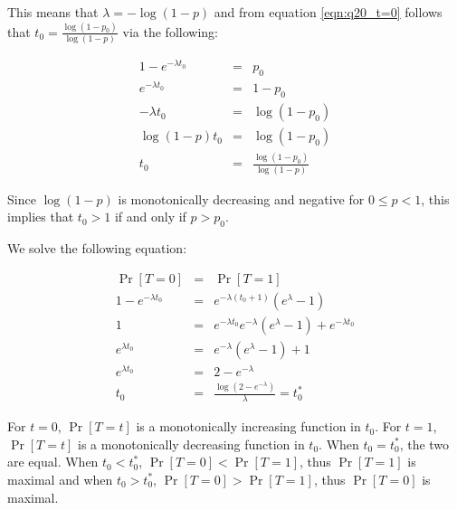 \documentclass[11pt]{article}
\begin{document}
This means that $\lambda = -\log(1-p)$ and from equation \ref{eqn:q20_t=0} follows that $t_{0} = \frac{\log(1 - p_{0})}{\log(1-p)}$ via the following:

\begin{eqnarray}
1 - e^{-\lambda t_{0}} &=& p_{0} \\
e^{-\lambda t_{0}} &=& 1 - p_{0} \\
-\lambda t_{0} &=& \log(1 - p_{0}) \\
\log(1-p) t_{0} &=& \log(1 - p_{0}) \\
t_{0} &=& \frac{\log(1 - p_{0})}{\log(1-p)}
\end{eqnarray}

Since $\log(1-p)$ is monotonically decreasing and negative for $0 \leq p < 1$, this implies that $t_{0} > 1 $ if and only if $p > p_{0}$.

We solve the following equation:

\begin{eqnarray}
\Pr[T=0] &=& \Pr[T=1] \\
1 - e^{-\lambda t_{0}} &=& e^{-\lambda (t_{0} + 1)}(e^{\lambda}-1) \\
1 &=& e^{-\lambda t_{0}}e^{-\lambda}(e^{\lambda}-1) + e^{-\lambda t_{0}} \\
e^{\lambda t_{0}} &=& e^{-\lambda}(e^{\lambda}-1) +1 \\
e^{\lambda t_{0}} &=& 2 - e^{-\lambda} \\
t_{0} &=& \frac{\log(2 - e^{-\lambda})}{\lambda } = t_{0}^{*}
\end{eqnarray} 

For $t = 0$, $\Pr[T=t]$ is a monotonically increasing function in $t_{0}$. For $t = 1$, $\Pr[T=t]$ is a monotonically decreasing function in $t_{0}$. When $t_{0}= t_{0}^{*}$, the two are equal. When $t_{0}< t_{0}^{*}$, $\Pr[T=0] < \Pr[T=1]$, thus $\Pr[T=1]$ is maximal and when $t_{0} > t_{0}^{*}$, $\Pr[T=0] > \Pr[T=1]$, thus $\Pr[T=0]$ is maximal.
\end{document}
